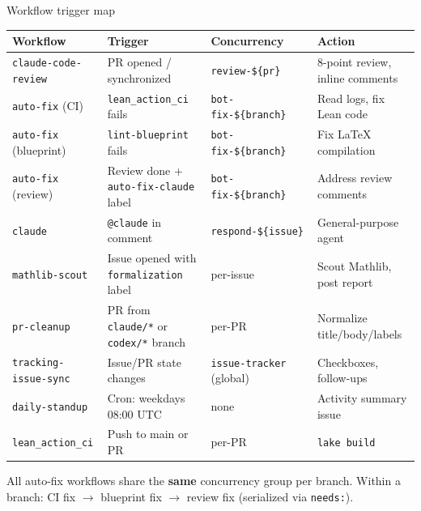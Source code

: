 \documentclass[aspectratio=169,10pt]{beamer}
\begin{document}
\begin{frame}{Workflow trigger map}
    \vspace{-0.4em}
    \begin{center}
    \renewcommand{\arraystretch}{1.15}
    {\fontsize{6.5pt}{8pt}\selectfont
    \begin{tabular}{@{}l l l l@{}}
        \toprule
        \textbf{Workflow} & \textbf{Trigger} & \textbf{Concurrency} & \textbf{Action} \\
        \midrule
        \textcolor{leanblue}{\texttt{claude-code-review}} & PR opened / synchronized & \texttt{review-\$\{pr\}} & 8-point review, inline comments \\
        \textcolor{amber}{\texttt{auto-fix}} (CI) & \texttt{lean\_action\_ci} fails & \texttt{bot-fix-\$\{branch\}} & Read logs, fix Lean code \\
        \textcolor{amber}{\texttt{auto-fix}} (blueprint) & \texttt{lint-blueprint} fails & \texttt{bot-fix-\$\{branch\}} & Fix \LaTeX{} compilation \\
        \textcolor{amber}{\texttt{auto-fix}} (review) & Review done + \texttt{auto-fix-claude} label & \texttt{bot-fix-\$\{branch\}} & Address review comments \\
        \textcolor{leangreen}{\texttt{claude}} & \texttt{@claude} in comment & \texttt{respond-\$\{issue\}} & General-purpose agent \\
        \textcolor{leanblue}{\texttt{mathlib-scout}} & Issue opened with \texttt{formalization} label & per-issue & Scout Mathlib, post report \\
        \textcolor{mintgreen}{\texttt{pr-cleanup}} & PR from \texttt{claude/*} or \texttt{codex/*} branch & per-PR & Normalize title/body/labels \\
        \textcolor{deepblue}{\texttt{tracking-issue-sync}} & Issue/PR state changes & \texttt{issue-tracker} (global) & Checkboxes, follow-ups \\
        \textcolor{dimwhite}{\texttt{daily-standup}} & Cron: weekdays 08:00 UTC & none & Activity summary issue \\
        \texttt{lean\_action\_ci} & Push to main or PR & per-PR & \texttt{lake build} \\
        \bottomrule
    \end{tabular}
    }
    \end{center}
    \vspace{0.3em}
    \textcolor{dimwhite}{\footnotesize All auto-fix workflows share the \textbf{same} concurrency group per branch. Within a branch: CI fix $\to$ blueprint fix $\to$ review fix (serialized via \texttt{needs:}).}
\end{frame}
\end{document}
